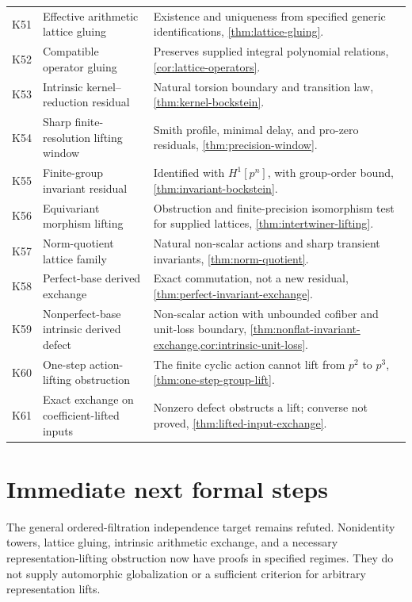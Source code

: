 \documentclass[11pt]{article}
\theoremstyle{definition}
\theoremstyle{remark}
\begin{document}
\begin{longtable}{>{\raggedright\arraybackslash}p{} >{\raggedright\arraybackslash}p{} >{\raggedright\arraybackslash}p{}}
K51 & Effective arithmetic lattice gluing & Existence and uniqueness from specified generic identifications, \cref{thm:lattice-gluing}.\\
K52 & Compatible operator gluing & Preserves supplied integral polynomial relations, \cref{cor:lattice-operators}.\\
K53 & Intrinsic kernel--reduction residual & Natural torsion boundary and transition law, \cref{thm:kernel-bockstein}.\\
K54 & Sharp finite-resolution lifting window & Smith profile, minimal delay, and pro-zero residuals, \cref{thm:precision-window}.\\
K55 & Finite-group invariant residual & Identified with $H^1[p^n]$, with group-order bound, \cref{thm:invariant-bockstein}.\\
K56 & Equivariant morphism lifting & Obstruction and finite-precision isomorphism test for supplied lattices, \cref{thm:intertwiner-lifting}.\\
K57 & Norm-quotient lattice family & Natural non-scalar actions and sharp transient invariants, \cref{thm:norm-quotient}.\\
K58 & Perfect-base derived exchange & Exact commutation, not a new residual, \cref{thm:perfect-invariant-exchange}.\\
K59 & Nonperfect-base intrinsic derived defect & Non-scalar action with unbounded cofiber and unit-loss boundary, \cref{thm:nonflat-invariant-exchange,cor:intrinsic-unit-loss}.\\
K60 & One-step action-lifting obstruction & The finite cyclic action cannot lift from $p^2$ to $p^3$, \cref{thm:one-step-group-lift}.\\
K61 & Exact exchange on coefficient-lifted inputs & Nonzero defect obstructs a lift; converse not proved, \cref{thm:lifted-input-exchange}.\\
\bottomrule
\end{longtable}

\section{Immediate next formal steps}

The general ordered-filtration independence target remains refuted. Nonidentity towers, lattice gluing, intrinsic arithmetic exchange, and a necessary representation-lifting obstruction now have proofs in specified regimes. They do not supply automorphic globalization or a sufficient criterion for arbitrary representation lifts.
\end{document}
